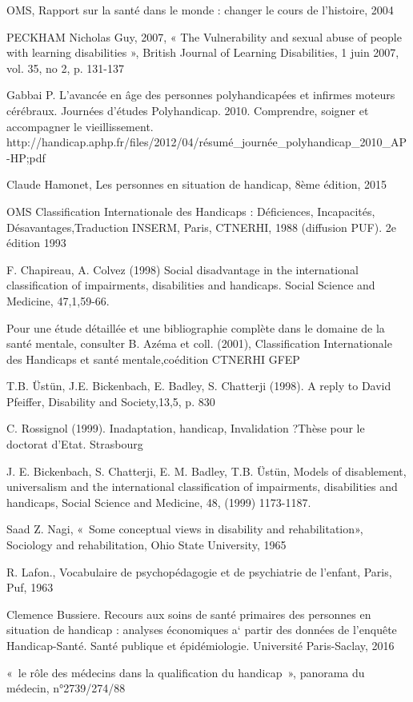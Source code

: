 OMS, Rapport sur la santé dans le monde : changer le cours de l'histoire, 2004

PECKHAM Nicholas Guy, 2007, « The Vulnerability and sexual abuse of people with learning disabilities », British Journal of Learning Disabilities, 1 juin 2007, vol. 35, no 2, p. 131-137


Gabbai P. L’avancée en âge des personnes polyhandicapées et infirmes moteurs cérébraux. Journées d’études Polyhandicap. 2010. Comprendre, soigner et accompagner le vieillissement. http://handicap.aphp.fr/files/2012/04/résumé_journée_polyhandicap_2010_AP-HP;pdf


Claude Hamonet, Les personnes en situation de handicap, 8ème édition, 2015

OMS Classification Internationale des Handicaps : Déficiences, Incapacités, Désavantages,Traduction INSERM, Paris, CTNERHI, 1988 (diffusion PUF). 2e édition 1993

F. Chapireau, A. Colvez (1998) Social disadvantage in the international classification of impairments, disabilities and handicaps. Social Science and Medicine, 47,1,59-66.

Pour une étude détaillée et une bibliographie complète dans le domaine de la santé mentale, consulter B. Azéma et coll. (2001), Classification Internationale des Handicaps et santé mentale,coédition CTNERHI GFEP

T.B. Üstün, J.E. Bickenbach, E. Badley, S. Chatterji (1998). A reply to David Pfeiffer, Disability and Society,13,5, p. 830

C. Rossignol (1999). Inadaptation, handicap, Invalidation ?Thèse pour le doctorat d’Etat. Strasbourg

J. E. Bickenbach, S. Chatterji, E. M. Badley, T.B. Üstün, Models of disablement, universalism and the international classification of impairments, disabilities and handicaps, Social Science and Medicine, 48, (1999) 1173-1187.

Saad Z. Nagi, « Some conceptual views in disability and rehabilitation», Sociology and rehabilitation, Ohio State University, 1965

R. Lafon., Vocabulaire de psychopédagogie et de psychiatrie de l’enfant, Paris, Puf, 1963

Clemence Bussiere. Recours aux soins de santé primaires des personnes en situation de handicap : analyses économiques a` partir des données de l’enquête Handicap-Santé. Santé publique et épidémiologie. Université Paris-Saclay, 2016


« le rôle des médecins dans la qualification du handicap », panorama du médecin, n°2739/274/88

